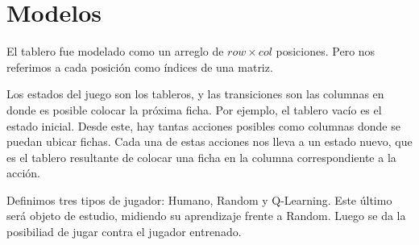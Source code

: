 \section{Modelos}

El tablero fue modelado como un arreglo de $row \times col$ posiciones. Pero nos referimos a cada posici\'on como \'indices de una matriz.

Los estados del juego son los tableros, y las transiciones son las columnas en donde es posible colocar la pr\'oxima ficha. Por ejemplo, el tablero vacío es el estado inicial. Desde este, hay tantas acciones posibles como columnas donde se puedan ubicar fichas. Cada una de estas acciones nos lleva a un estado nuevo, que es el tablero resultante de colocar una ficha en la columna correspondiente a la acción.

Definimos tres tipos de jugador: Humano, Random y Q-Learning. Este \'ultimo ser\'a objeto de estudio, midiendo su aprendizaje frente a Random. Luego se da la posibiliad de jugar contra el jugador entrenado.
